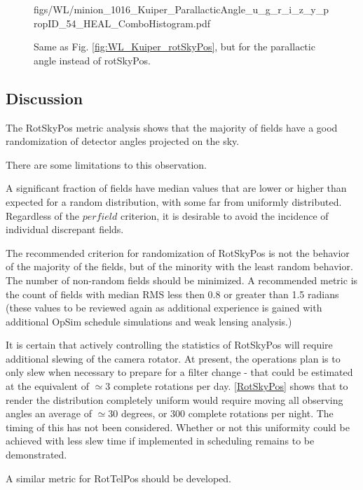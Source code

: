 \begin{figure}[tbh!]
        {figs/WL/minion_1016_Kuiper_ParallacticAngle_u_g_r_i_z_y_propID_54_HEAL_ComboHistogram.pdf}
\caption{Same as Fig. \ref{fig:WL_Kuiper_rotSkyPos}, but for the parallactic angle instead of
    rotSkyPos.}
\label{fig:WL_Kuiper_ParallacticAngle}
\end{figure}


\subsection{Discussion}

The RotSkyPos metric analysis shows that the majority of fields have a
good randomization of detector angles projected on the sky.

There are some limitations to this observation.


A significant fraction of fields  have median values that are
lower or higher than expected for a random distribution, with some far
from uniformly distributed.  Regardless of the $per field$ criterion,
it is desirable to avoid the incidence of individual discrepant
fields.

The recommended criterion for randomization of RotSkyPos is not the
behavior of the majority of the fields, but of the minority with the
least random behavior.  The number of non-random fields should be
minimized.  A recommended metric is the count of fields with median
RMS less then 0.8 or greater than 1.5 radians (these values to be
reviewed again as additional experience is gained with additional
OpSim schedule simulations and weak lensing analysis.)

It is certain that actively controlling the statistics of RotSkyPos
will require additional slewing of the camera rotator.  At present,
the operations plan is to only slew when necessary to prepare for a
filter change - that could be estimated at the equivalent of $\simeq
3$ complete rotations per day.  \autoref{RotSkyPos} shows that to
render the distribution completely uniform would require moving all
observing angles an average of $\simeq 30$ degrees, or 300 complete
rotations per night.  The timing of this has not been considered.
Whether or not this uniformity could be achieved with less slew time
if implemented in scheduling remains to be demonstrated.

A similar metric for RotTelPos should be developed.
